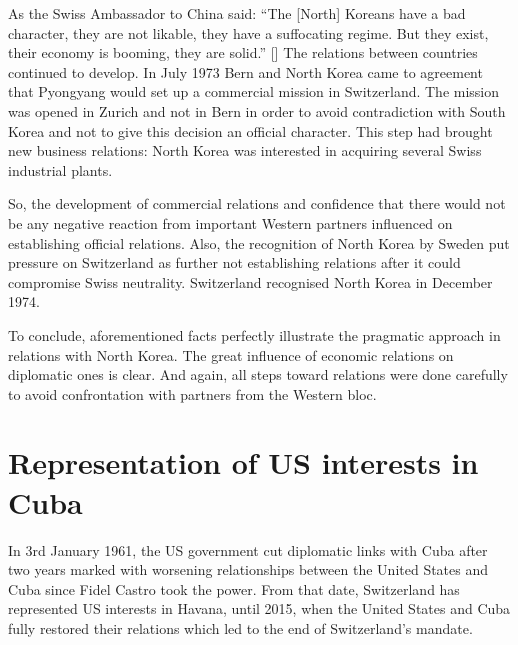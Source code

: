 \documentclass[a4paper]{article}
\begin{document}
As the Swiss Ambassador to China said: “The [North] Koreans have a bad character, they are not likable, they have a suffocating regime. But they exist, their economy is booming, they are solid.” [] The relations between countries continued to develop. In July 1973 Bern and North Korea came to agreement that Pyongyang would set up a commercial mission in Switzerland. The mission was opened in Zurich and not in Bern in order to avoid contradiction with South Korea and not to give this decision an official character. This step had brought new business relations: North Korea was interested in acquiring several Swiss industrial plants. 

So, the development of commercial relations and confidence that there would not be any negative reaction from important Western partners influenced on establishing official relations. Also, the recognition of North Korea by Sweden put pressure on Switzerland as further not establishing relations after it could compromise Swiss neutrality. Switzerland recognised North Korea in December 1974.

To conclude, aforementioned facts perfectly illustrate the pragmatic approach in relations with North Korea. The great influence of economic relations on diplomatic ones is clear. And again, all steps toward relations were done carefully to avoid confrontation with partners from the Western bloc.
\clearpage
\section{Representation of US interests in Cuba}
In 3rd January 1961, the US government cut diplomatic links with Cuba after two years marked with worsening relationships between the United States and Cuba since Fidel Castro took the power. 
From that date, Switzerland has represented US interests in Havana, until 2015, when the United States and Cuba fully restored their relations which led to the end of Switzerland’s mandate. 
\end{document}

